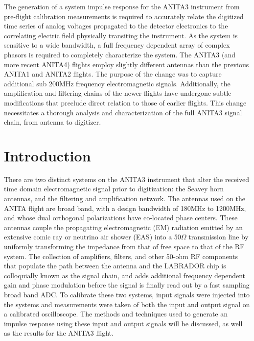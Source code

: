 %
%
%
%

	The generation of a system impulse response for the ANITA3 instrument from pre-flight calibration measurements is required to accurately relate the digitized time series of analog voltages propagated to the detector electronics to the correlating electric field physically transiting the instrument.  As the system is sensitive to a wide bandwidth, a full frequency dependent array of complex phasors is required to completely characterize the system.  The ANITA3 (and more recent ANITA4) flights employ slightly different antennas than the previous ANITA1 and ANITA2 flights.  The purpose of the change was to capture additional sub 200MHz frequency electromagnetic signals.  Additionally, the amplification and filtering chains of the newer flights have undergone subtle modifications that preclude direct relation to those of earlier flights.  This change necessitates a thorough analysis and characterization of the full ANITA3 signal chain, from antenna to digitizer.
	
\section{Introduction}

	There are two distinct systems on the ANITA3 instrument that alter the received time domain electromagnetic signal prior to digitization: the Seavey horn antennas, and the filtering and amplification network.  The antennas used on the ANITA flight are broad band, with a design bandwidth of 180MHz to 1200MHz, and whose dual orthogonal polarizations have co-located phase centers.  These antennas couple the propagating electromagnetic (EM) radiation emitted by an extensive comic ray or neutrino air shower (EAS) into a 50$\Omega$ transmission line by uniformly transforming the impedance from that of free space to that of the RF system.  The collection of amplifiers, filters, and other 50-ohm RF components that populate the path between the antenna and the LABRADOR chip is colloquially known as the signal chain, and adds additional frequency dependent gain and phase modulation before the signal is finally read out by a fast sampling broad band ADC.  To calibrate these two systems, input signals were injected into the systems and measurements were taken of both the input and output signal on a calibrated oscilloscope.  The methods and techniques used to generate an impulse response using these input and output signals will be discussed, as well as the results for the ANITA3 flight.

